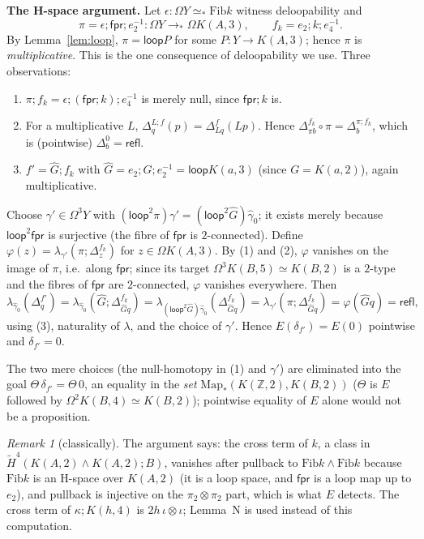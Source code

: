 \documentclass[11pt]{amsart}
\theoremstyle{definition}
\theoremstyle{remark}
\newtheorem{remark}[theorem]{Remark}
\newcommand{\Om}{\Omega}
\newcommand{\Z}{\mathbb{Z}}
\newcommand{\Map}{\mathrm{Map}_*}
\newcommand{\Fib}{\mathrm{Fib}}
\newcommand{\fpr}{\mathsf{fpr}}
\newcommand{\lp}{\mathsf{loop}}
\newcommand{\pteq}{\simeq_*}
\newcommand{\refl}{\mathsf{refl}}
\begin{document}
\smallskip\noindent\textbf{The H-space argument.} Let $\epsilon:\Om Y\pteq\Fib
k$ witness deloopability and
\[
  \pi=\epsilon;\fpr;e_2^{-1}:\Om Y\to_*\Om K(A,3),\qquad f_k=e_2;k;e_4^{-1}.
\]
By Lemma~\ref{lem:loop}, $\pi=\lp P$ for some $P:Y\to K(A,3)$; hence $\pi$ is
\emph{multiplicative}. This is the one consequence of deloopability we use.
Three observations:
\begin{enumerate}
\item $\pi;f_k=\epsilon;(\fpr;k);e_4^{-1}$ is merely null, since $\fpr;k$ is.
\item For a multiplicative $L$, $\Delta^{L;f}_{q}(p)=\Delta^f_{Lq}(Lp)$. Hence
$\Delta^{f_k}_{\pi b}\circ\pi=\Delta^{\pi;f_k}_b$, which is (pointwise) $\Delta^0_b=\refl$.
\item $f'=\hat G;f_k$ with $\hat G=e_2;G;e_2^{-1}=\lp K(a,3)$ (since
$G=K(a,2)$), again multiplicative.
\end{enumerate}
Choose $\gamma'\in\Om^3Y$ with $(\lp^2\pi)\gamma'=(\lp^2\hat G)\hat\gamma_0$; it
exists merely because $\lp^2\fpr$ is surjective (the fibre of $\fpr$ is
$2$-connected). Define $\varphi(z)=\lambda_{\gamma'}(\pi;\Delta^{f_k}_z)$ for
$z\in\Om K(A,3)$. By (1) and (2), $\varphi$ vanishes on the image of $\pi$, i.e.\
along $\fpr$; since its target $\Om^3K(B,5)\simeq K(B,2)$ is a $2$-type and the
fibres of $\fpr$ are $2$-connected, $\varphi$ vanishes everywhere. Then
\[
  \lambda_{\hat\gamma_0}(\Delta^{f'}_q)
  =\lambda_{\hat\gamma_0}(\hat G;\Delta^{f_k}_{\hat Gq})
  =\lambda_{(\lp^2\hat G)\hat\gamma_0}(\Delta^{f_k}_{\hat Gq})
  =\lambda_{\gamma'}(\pi;\Delta^{f_k}_{\hat Gq})=\varphi(\hat Gq)=\refl ,
\]
using (3), naturality of $\lambda$, and the choice of $\gamma'$. Hence
$E(\delta_{f'})=E(0)$ pointwise and $\delta_{f'}=0$.

The two mere choices (the null-homotopy in (1) and $\gamma'$) are eliminated
into the goal $\Theta\,\delta_{f'}=\Theta\,0$, an equality in the \emph{set}
$\Map(K(\Z,2),K(B,2))$ ($\Theta$ is $E$ followed by $\Om^2K(B,4)\simeq K(B,2)$);
pointwise equality of $E$ alone would not be a proposition.

\begin{remark}[classically]
The argument says: the cross term of $k$, a class in
$\tilde H^4(K(A,2)\wedge K(A,2);B)$, vanishes after pullback to $\Fib k\wedge\Fib k$
because $\Fib k$ is an H-space over $K(A,2)$ (it is a loop space, and $\fpr$ is
a loop map up to $e_2$), and pullback is injective on the $\pi_2\otimes\pi_2$
part, which is what $E$ detects. The cross term of $\kappa;K(h,4)$ is
$2h\,\iota\otimes\iota$; Lemma~N is used instead of this computation.
\end{remark}
\end{document}
